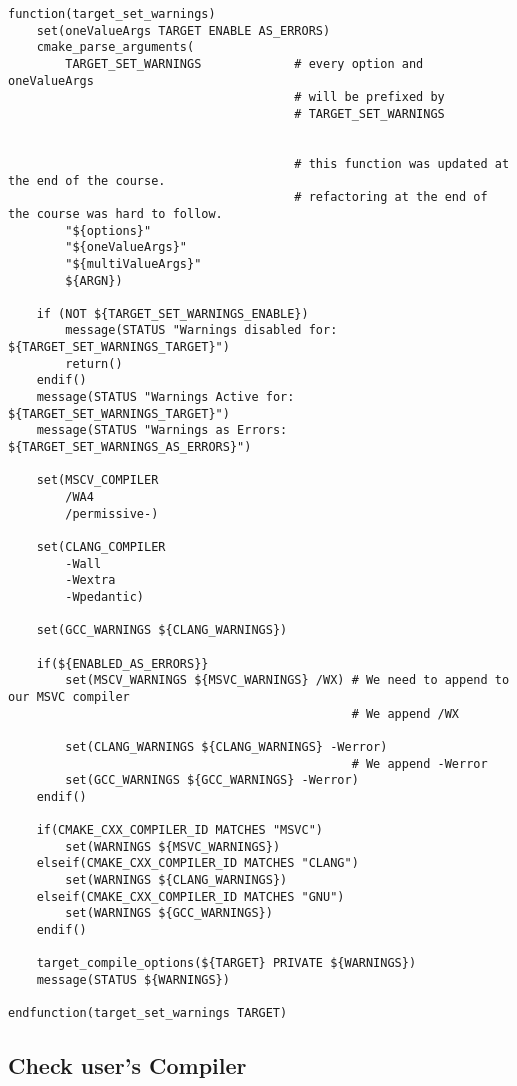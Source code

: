 \begin{verbatim}
function(target_set_warnings)
    set(oneValueArgs TARGET ENABLE AS_ERRORS)
    cmake_parse_arguments(
        TARGET_SET_WARNINGS             # every option and oneValueArgs
                                        # will be prefixed by
                                        # TARGET_SET_WARNINGS


                                        # this function was updated at the end of the course.
                                        # refactoring at the end of the course was hard to follow.
        "${options}"
        "${oneValueArgs}"
        "${multiValueArgs}"
        ${ARGN})

    if (NOT ${TARGET_SET_WARNINGS_ENABLE})
        message(STATUS "Warnings disabled for: ${TARGET_SET_WARNINGS_TARGET}")
        return()
    endif()
    message(STATUS "Warnings Active for: ${TARGET_SET_WARNINGS_TARGET}")
    message(STATUS "Warnings as Errors: ${TARGET_SET_WARNINGS_AS_ERRORS}")

    set(MSCV_COMPILER
        /WA4
        /permissive-)

    set(CLANG_COMPILER
        -Wall
        -Wextra
        -Wpedantic)

    set(GCC_WARNINGS ${CLANG_WARNINGS})

    if(${ENABLED_AS_ERRORS}}
        set(MSCV_WARNINGS ${MSVC_WARNINGS} /WX) # We need to append to our MSVC compiler
                                                # We append /WX

        set(CLANG_WARNINGS ${CLANG_WARNINGS} -Werror)
                                                # We append -Werror
        set(GCC_WARNINGS ${GCC_WARNINGS} -Werror)
    endif()

    if(CMAKE_CXX_COMPILER_ID MATCHES "MSVC")
        set(WARNINGS ${MSVC_WARNINGS})
    elseif(CMAKE_CXX_COMPILER_ID MATCHES "CLANG")
        set(WARNINGS ${CLANG_WARNINGS})
    elseif(CMAKE_CXX_COMPILER_ID MATCHES "GNU")
        set(WARNINGS ${GCC_WARNINGS})
    endif()

    target_compile_options(${TARGET} PRIVATE ${WARNINGS})
    message(STATUS ${WARNINGS})

endfunction(target_set_warnings TARGET)
\end{verbatim}

\subsection{Check user's Compiler}

